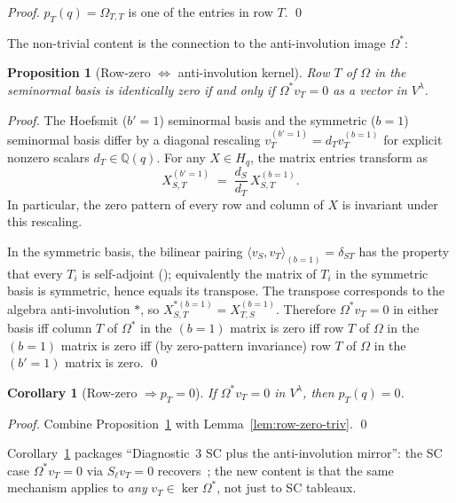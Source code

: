 \documentclass[11pt]{article}
\newtheorem{proposition}[theorem]{Proposition}
\newtheorem{corollary}[theorem]{Corollary}
\theoremstyle{definition}
\newcommand{\Hq}{H_q}
\newcommand{\Vlam}{V^\lambda}
\newcommand{\Om}{\Omega}
\newcommand{\Omstar}{\Omega^{\ast}}
\newcommand{\pT}{p_T}
\begin{document}
\begin{proof}
$\pT(q) = \Om_{T, T}$ is one of the entries in row $T$. \qed
\end{proof}

The non-trivial content is the connection to the anti-involution image
$\Omstar$:

\begin{proposition}[Row-zero $\Leftrightarrow$ anti-involution kernel]
\label{prop:row-anti}
Row $T$ of $\Om$ in the seminormal basis is identically zero if and only
if $\Omstar v_T = 0$ as a vector in $\Vlam$.
\end{proposition}

\begin{proof}
The Hoefsmit ($b'\!=\!1$) seminormal basis and the symmetric ($b\!=\!1$)
seminormal basis differ by a diagonal rescaling $v_T^{(b'=1)} = d_T
v_T^{(b=1)}$ for explicit nonzero scalars $d_T \in \mathbb{Q}(q)$.
For any $X \in \Hq$, the matrix entries transform as
\[
   X^{(b'=1)}_{S, T}
   \;=\; \frac{d_S}{d_T}\, X^{(b=1)}_{S, T}.
\]
In particular, the zero pattern of every row and column of $X$ is
invariant under this rescaling.

In the symmetric basis, the bilinear pairing $\langle v_S, v_T
\rangle_{(b=1)} = \delta_{ST}$ has the property that every $T_i$ is
self-adjoint (\cite[\S3]{Murphy}); equivalently the matrix of $T_i$ in
the symmetric basis is symmetric, hence equals its transpose. The
transpose corresponds to the algebra anti-involution $\ast$, so
$X^{\ast (b=1)}_{S, T} = X^{(b=1)}_{T, S}$. Therefore
$\Omstar v_T = 0$ in either basis iff column $T$ of $\Omstar$ in the
$(b\!=\!1)$ matrix is zero iff row $T$ of $\Om$ in the $(b\!=\!1)$
matrix is zero iff (by zero-pattern invariance) row $T$ of $\Om$ in the
$(b'\!=\!1)$ matrix is zero. \qed
\end{proof}

\begin{corollary}[Row-zero $\Rightarrow \pT = 0$]\label{lem:row-zero}
If $\Omstar v_T = 0$ in $\Vlam$, then $\pT(q) = 0$.
\end{corollary}

\begin{proof}
Combine Proposition~\ref{prop:row-anti} with
Lemma~\ref{lem:row-zero-triv}. \qed
\end{proof}

Corollary~\ref{lem:row-zero} packages ``Diagnostic~3 SC plus the
anti-involution mirror'': the SC case $\Omstar v_T = 0$ via
$S_\ell v_T = 0$ recovers~\cite[Thm.~1]{leftmostPerSYT}; the new content
is that the same mechanism applies to \emph{any} $v_T \in \ker\Omstar$,
not just to SC tableaux.
\end{document}
